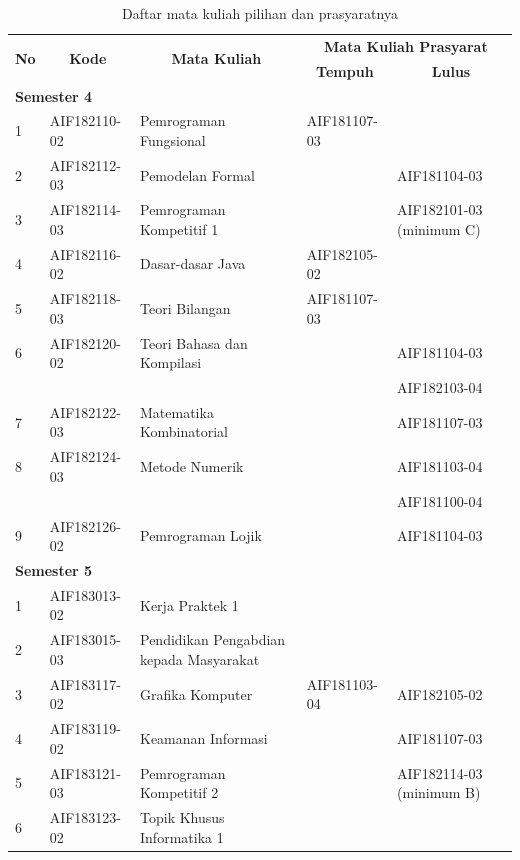 \begin{table}[H]
	\centering
		\caption{Daftar mata kuliah pilihan dan prasyaratnya}
		\begin{tabular}{|p{0.5cm}|p{2.85cm}|p{4.95cm}|p{2.7cm}|p{2.7cm}|}
			\hline
			\multicolumn{1}{|c|}{\multirow{2}{*}{\textbf{No}}} & \multicolumn{1}{c|}{\multirow{2}{*}{\textbf{Kode}}} & \multicolumn{1}{c|}{\multirow{2}{*}{\textbf{Mata Kuliah}}} & \multicolumn{2}{c|}{\textbf{Mata Kuliah Prasyarat}} \\ \cline{4-5}
			 &  &  & \multicolumn{1}{c|}{\textbf{Tempuh}} & \multicolumn{1}{c|}{\textbf{Lulus}} \\ \hline
			\multicolumn{5}{|l|}{\textbf{Semester 4}} \\ \hline
1 & AIF182110-02 & Pemrograman Fungsional & AIF181107-03 &  \\ \hline
2 & AIF182112-03 & Pemodelan Formal &  & AIF181104-03 \\ \hline
3 & AIF182114-03 & Pemrograman Kompetitif 1 &  & AIF182101-03 (minimum C) \\ \hline
4 & AIF182116-02 & Dasar-dasar Java & AIF182105-02 &  \\ \hline
5 & AIF182118-03 & Teori Bilangan & AIF181107-03 &  \\ \hline
6 & AIF182120-02 & Teori Bahasa dan Kompilasi &  & AIF181104-03 \\
 &  &  &  & AIF182103-04 \\ \hline
7 & AIF182122-03 & Matematika Kombinatorial &  & AIF181107-03 \\ \hline
8 & AIF182124-03 & Metode Numerik &  & AIF181103-04 \\
 &  &  &  & AIF181100-04 \\ \hline
9 & AIF182126-02 & Pemrograman Lojik &  & AIF181104-03 \\ \hline
\multicolumn{5}{|l|}{\textbf{Semester 5}} \\ \hline
1 & AIF183013-02 & Kerja Praktek 1 &  &  \\ \hline
2 & AIF183015-03 & Pendidikan Pengabdian kepada Masyarakat &  &  \\ \hline
3 & AIF183117-02 & Grafika Komputer & AIF181103-04 & AIF182105-02 \\ \hline
4 & AIF183119-02 & Keamanan Informasi &  & AIF181107-03 \\ \hline
5 & AIF183121-03 & Pemrograman Kompetitif 2 &  & AIF182114-03 (minimum B) \\ \hline
6 & AIF183123-02 & Topik Khusus Informatika 1 &  &  \\ \hline

\end{tabular}
\end{table}
